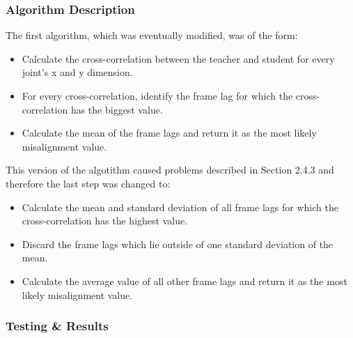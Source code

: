 \documentclass[a4paper]{article}
\begin{document}
\subsubsection{Algorithm Description}
\noindent
The first algorithm, which was eventually modified, was of the form:
\begin{itemize}
\setlength{\itemsep}{1pt}
\setlength{\parskip}{0pt}
\setlength{\parsep}{0pt}
	\item Calculate the cross-correlation between the teacher and student for every joint's x and y dimension.
	\item For every cross-correlation, identify the frame lag for which the cross-correlation has the biggest value.
	\item Calculate the mean of the frame lags and return it as the most likely misalignment value.
\end{itemize}
This version of the algotithm caused problems described in Section 2.4.3 and therefore the last step was changed to:
\begin{itemize}
\setlength{\itemsep}{1pt}
\setlength{\parskip}{0pt}
\setlength{\parsep}{0pt}
	\item Calculate the mean and standard deviation of all frame lags for which the cross-correlation has the highest value.
	\item Discard the frame lags which lie outside of one standard deviation of the mean.
	\item Calculate the average value of all other frame lags and return it as the most likely misalignment value.
\end{itemize}

\subsubsection{Testing \& Results}
\end{document}
